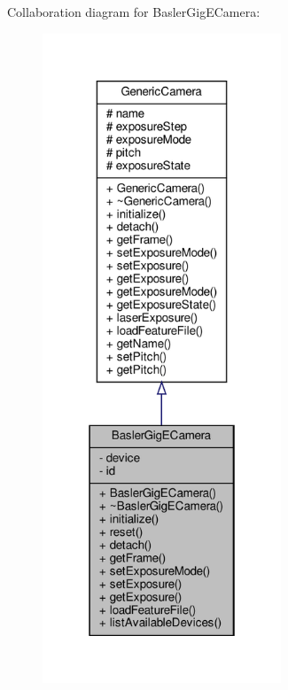 Collaboration diagram for Basler\+Gig\+E\+Camera\+:\nopagebreak
\begin{figure}[H]
\begin{center}
\leavevmode
\includegraphics[height=550pt]{class_basler_gig_e_camera__coll__graph}
\end{center}
\end{figure}
